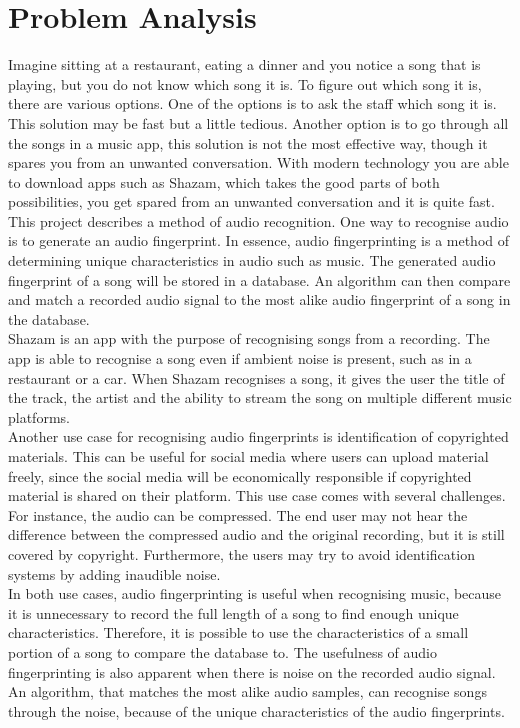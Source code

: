 \chapter{Problem Analysis}
Imagine sitting at a restaurant, eating a dinner and you notice a song that is playing, but you do not know which song it is. To figure out which song it is, there are various options. One of the options is to ask the staff which song it is. This solution may be fast but a little tedious. Another option is to go through all the songs in a music app, this solution is not the most effective way, though it spares you from an unwanted conversation. With modern technology you are able to download apps such as Shazam, which takes the good parts of both possibilities, you get spared from an unwanted conversation and it is quite fast.\\

\noindent This project describes a method of audio recognition. One way to recognise audio is to generate an audio fingerprint. In essence, audio fingerprinting is a method of determining unique characteristics in audio such as music. The generated audio fingerprint of a song will be stored in a database. An algorithm can then compare and match a recorded audio signal to the most alike audio fingerprint of a song in the database.\\ %
\indent Shazam is an app with the purpose of recognising songs from a recording. The app is able to recognise a song even if ambient noise is present, such as in a restaurant or a car. When Shazam recognises a song, it gives the user the title of the track, the artist and the ability to stream the song on multiple different music platforms. \cite{ShazamDescription} \\
\indent Another use case for recognising audio fingerprints is identification of copyrighted materials. This can be useful for social media where users can upload material freely, since the social media will be economically responsible if copyrighted material is shared on their platform. This use case comes with several challenges. For instance, the audio can be compressed. The end user may not hear the difference between the compressed audio and the original recording, but it is still covered by copyright. Furthermore, the users may try to avoid identification systems by adding inaudible noise. \cite{haitsma2003highly}\\
\indent In both use cases, audio fingerprinting is useful when recognising music, because it is unnecessary to record the full length of a song to find enough unique characteristics. Therefore, it is possible to use the characteristics of a small portion of a song to compare the database to. 
The usefulness of audio fingerprinting is also apparent when there is noise on the recorded audio signal. An algorithm, that matches the most alike audio samples, can recognise songs through the noise, because of the unique characteristics of the audio fingerprints. 


